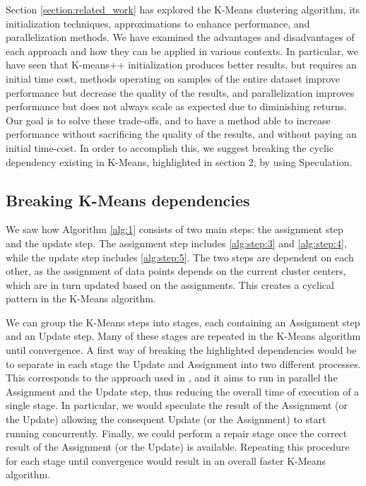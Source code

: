 Section \ref{section:related_work} has explored the K-Means clustering algorithm, its initialization techniques, approximations to enhance performance, and parallelization methods. We have examined the advantages and disadvantages of each approach and how they can be applied in various contexts. In particular, we have seen that K-means++ initialization produces better results, but requires an initial time cost, methods operating on samples of the entire dataset improve performance but decrease the quality of the results, and parallelization improves performance but does not always scale as expected due to diminishing returns. Our goal is to solve these trade-offs, and to have a method able to increase performance without sacrificing the quality of the results, and without paying an initial time-cost.  In order to accomplish this, we suggest breaking the cyclic dependency existing in K-Means, highlighted in section 2, by using Speculation. 

\subsection{Breaking K-Means dependencies}
\label{section:breaking_dependencies}
We saw how Algorithm \ref{alg:1} consists of two main steps: the assignment step and the update step. The assignment step includes \ref{alg:step:3} and \ref{alg:step:4}, while the update step includes \ref{alg:step:5}. The two steps are dependent on each other, as the assignment of data points depends on the current cluster centers, which are in turn updated based on the assignments. This creates a cyclical pattern in the K-Means algorithm.

We can group the K-Means steps into stages, each containing an Assignment step and
an Update step. Many of these stages are repeated in the K-Means algorithm until convergence.
A first way of breaking the highlighted dependencies would be to separate in each stage the Update and Assignment into two different processes. This corresponds to the approach used in \cite{Sioulas:282304}, and it aims to run in parallel the Assignment and the Update step, thus reducing the overall time of execution of a single stage. In particular, we would speculate the result of the Assignment (or the Update) allowing the consequent Update (or the Assignment) to start running concurrently. Finally, we could perform a repair stage once the correct result of the Assignment (or the Update) is available. Repeating this procedure for each stage until convergence would result in an overall faster K-Means algorithm.

